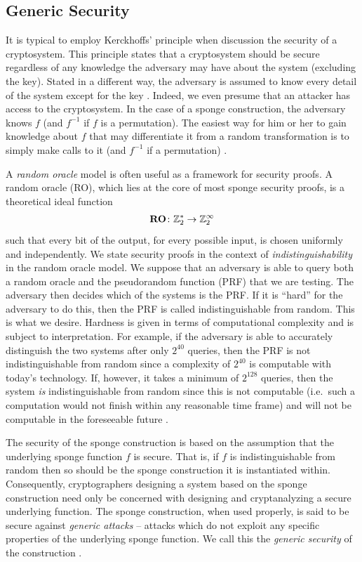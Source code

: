 \subsection{Generic Security}
\label{subsec:SpongeSecurity}
It is typical to employ Kerckhoffs' principle when discussion the security of a cryptosystem.
This principle states that a cryptosystem should be secure regardless of any knowledge the adversary may have about the system (excluding the key).
Stated in a different way, the adversary is assumed to know every detail of the system except for the key \cite{Stinson2006_CTAP}.
Indeed, we even presume that an attacker has access to the cryptosystem.
In the case of a sponge construction, the adversary knows $f$ (and $f^{-1}$ if $f$ is a permutation).
The easiest way for him or her to gain knowledge about $f$ that may differentiate it from a random transformation is to simply make calls to it (and $f^{-1}$ if a permutation) \cite{Bertoni2011_SpongeFunctions}.

A \emph{random oracle} model is often useful as a framework for security proofs.
A random oracle (RO), which lies at the core of most sponge security proofs, is a theoretical ideal function
\begin{equation*}
\mathbf{RO} \colon \mathbb{Z}_2^* \rightarrow \mathbb{Z}_2^{\infty}
\end{equation*}
such that every bit of the output, for every possible input, is chosen uniformly and independently. 
We state security proofs in the context of \emph{indistinguishability} in the random oracle model. 
We suppose that an adversary is able to query both a random oracle and the pseudorandom function (PRF) that we are testing.
The adversary then decides which of the systems is the PRF.
If it is ``hard'' for the adversary to do this, then the PRF is called indistinguishable from random. This is what we desire.
Hardness is given in terms of computational complexity and is subject to interpretation.
For example, if the adversary is able to accurately distinguish the two systems after only $2^{40}$ queries, then the PRF is not indistinguishable from random since a complexity of $2^{40}$ is computable with today's technology.
If, however, it takes a minimum of $2^{128}$ queries, then the system \emph{is} indistinguishable from random since this is not computable (i.e.\ such a computation would not finish within any reasonable time frame) and will not be computable in the foreseeable future \cite{Stinson2006_CTAP}.

The security of the sponge construction is based on the assumption that the underlying sponge function $f$ is secure.
That is, if $f$ is indistinguishable from random then so should be the sponge construction it is instantiated within.
Consequently, cryptographers designing a system based on the sponge construction need only be concerned with designing and cryptanalyzing a secure underlying function.
The sponge construction, when used properly, is said to be secure against \emph{generic attacks} -- attacks which do not exploit any specific properties of the underlying sponge function.
We call this the \emph{generic security} of the construction \cite{Bertoni2011_SpongeFunctions}.

